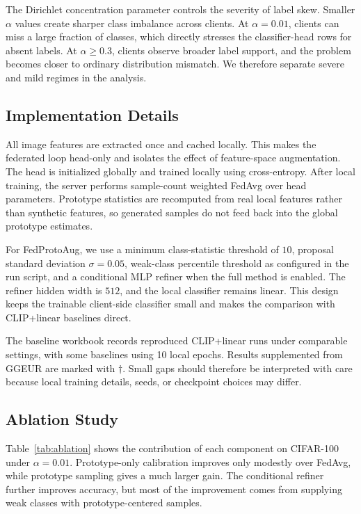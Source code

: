 ﻿\documentclass[conference]{IEEEtran}
\newcommand{\method}{FedProtoAug}
\begin{document}
The Dirichlet concentration parameter controls the severity of label skew. Smaller $\alpha$ values create sharper class imbalance across clients. At $\alpha = 0.01$, clients can miss a large fraction of classes, which directly stresses the classifier-head rows for absent labels. At $\alpha \ge 0.3$, clients observe broader label support, and the problem becomes closer to ordinary distribution mismatch. We therefore separate severe and mild regimes in the analysis.

\subsection{Implementation Details}
All image features are extracted once and cached locally. This makes the federated loop head-only and isolates the effect of feature-space augmentation. The head is initialized globally and trained locally using cross-entropy. After local training, the server performs sample-count weighted FedAvg over head parameters. Prototype statistics are recomputed from real local features rather than synthetic features, so generated samples do not feed back into the global prototype estimates.

For \method, we use a minimum class-statistic threshold of $10$, proposal standard deviation $\sigma = 0.05$, weak-class percentile threshold as configured in the run script, and a conditional MLP refiner when the full method is enabled. The refiner hidden width is $512$, and the local classifier remains linear. This design keeps the trainable client-side classifier small and makes the comparison with CLIP+linear baselines direct.

The baseline workbook records reproduced CLIP+linear runs under comparable settings, with some baselines using 10 local epochs. Results supplemented from GGEUR are marked with $\dagger$. Small gaps should therefore be interpreted with care because local training details, seeds, or checkpoint choices may differ.

\subsection{Ablation Study}
Table~\ref{tab:ablation} shows the contribution of each component on CIFAR-100 under $\alpha = 0.01$. Prototype-only calibration improves only modestly over FedAvg, while prototype sampling gives a much larger gain. The conditional refiner further improves accuracy, but most of the improvement comes from supplying weak classes with prototype-centered samples.
\end{document}
